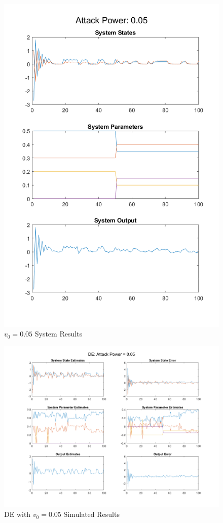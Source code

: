 \documentclass[]{ieeetran}
\begin{document}
\begin{figure}
	\centering
	\includegraphics[width=0.7\linewidth]{../../fig/SystemResponse_attack_0_05}
	\caption{$v_0 = 0.05$ System Results}
	\label{fig:systemresponseattack005}
\end{figure}

\begin{figure}
	\centering
	\includegraphics[width=\linewidth]{../../fig/DE_attack_0_05}
	\caption{DE with $v_0 = 0.05$ Simulated Results}
	\label{fig:deattack005}
\end{figure}
\end{document}
